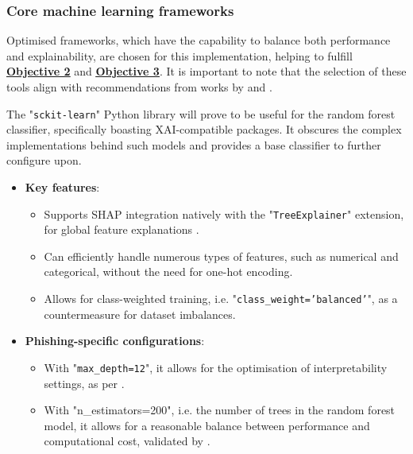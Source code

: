 
\subsubsection*{Core machine learning frameworks}
Optimised frameworks, which have the capability to balance both performance and explainability, are chosen for this implementation, helping to fulfill \hyperref[objective-2]{\uline{\textbf{Objective 2}}} and \hyperref[objective-3]{\uline{\textbf{Objective 3}}}. It is important to note that the selection of these tools align with recommendations from works by \cite{shirazi2022towards} and \cite{gupta2021novel}.\newline

\noindent The "\texttt{sckit-learn}" Python library will prove to be useful for the random forest classifier, specifically boasting XAI-compatible packages. It obscures the complex implementations behind such models and provides a base classifier to further configure upon.

\begin{itemize}
  \item \textbf{Key features}:
  \begin{itemize}
    \item Supports SHAP integration natively with the "\texttt{TreeExplainer}" extension, for global feature explanations \citep{lundberg2017unified}.
    \item Can efficiently handle numerous types of features, such as numerical and categorical, without the need for one-hot encoding.
    \item Allows for class-weighted training, i.e. "\texttt{class\_weight='balanced'}", as a countermeasure for dataset imbalances.
  \end{itemize}
  \item \textbf{Phishing-specific configurations}:
  \begin{itemize}
    \item With "\texttt{max\_depth=12}", it allows for the optimisation of interpretability settings, as per \citep{greco2023explaining}.
    \item With "n\_estimators=200", i.e. the number of trees in the random forest model, it allows for a reasonable balance between performance and computational cost, validated by \cite{kapoor2024comparative}.
  \end{itemize}
\end{itemize}

